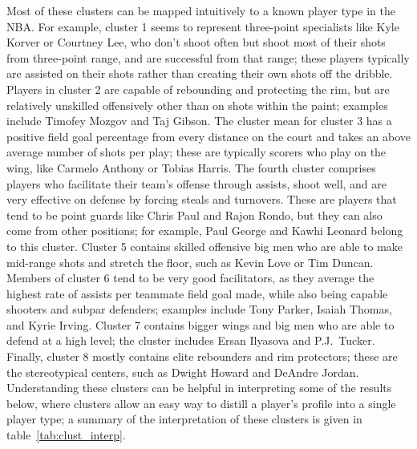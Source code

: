 Most of these clusters can be mapped intuitively to a known player type in the NBA.
For example, cluster 1 seems to represent three-point specialists like Kyle Korver
or Courtney Lee, who don't shoot often but shoot most of their shots from
three-point range, and are successful from that range; these players typically are
assisted on their shots rather than creating their own shots off the dribble.
Players in cluster 2 are capable of rebounding and protecting the rim, but are
relatively unskilled offensively other than on shots within the paint; examples
include Timofey Mozgov and Taj Gibson. The cluster mean for cluster 3 has a positive
field goal percentage from every distance on the court and takes an above average
number of shots per play; these are typically scorers who play on the wing, like
Carmelo Anthony or Tobias Harris. The fourth cluster comprises players who
facilitate their team's offense through assists, shoot well, and are very effective
on defense by forcing steals and turnovers. These are players that tend to be point
guards like Chris Paul and Rajon Rondo, but they can also come from other positions;
for example, Paul George and Kawhi Leonard belong to this cluster. Cluster 5
contains skilled offensive big men who are able to make mid-range shots and stretch
the floor, such as Kevin Love or Tim Duncan. Members of cluster 6 tend to be very
good facilitators, as they average the highest rate of assists per teammate field
goal made, while also being capable shooters and subpar defenders; examples include
Tony Parker, Isaiah Thomas, and Kyrie Irving. Cluster 7 contains bigger wings and
big men who are able to defend at a high level; the cluster includes Ersan Ilyasova
and P.J.\ Tucker.  Finally, cluster 8 mostly contains elite rebounders and rim
protectors; these are the stereotypical centers, such as Dwight Howard and DeAndre
Jordan. Understanding these clusters can be helpful in interpreting some of the
results below, where clusters allow an easy way to distill a player's profile into a
single player type; a summary of the interpretation of these clusters is given in
table~\ref{tab:clust_interp}.

